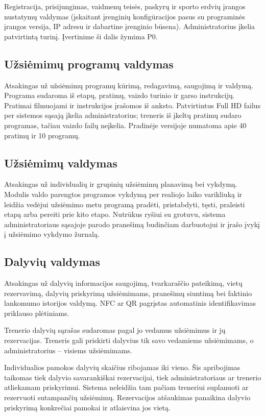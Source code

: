 \documentclass[a4paper,11pt]{article}
\begin{document}
Registracija, prisijungimas, vaidmenų teisės, paskyrų ir sporto erdvių įrangos nustatymų valdymas (įskaitant įrenginių konfigūracijos pasus su programinės įrangos versija, IP adresu ir dabartine įrenginio būsena). Administratorius įkelia patvirtintą turinį. Įvertinime ši dalis žymima P0.

\subsection{Užsiėmimų programų valdymas}

Atsakingas už užsiėmimų programų kūrimą, redagavimą, saugojimą ir valdymą. Programa sudaroma iš etapų, pratimų, vaizdo turinio ir garso instrukcijų. Pratimai filmuojami ir instrukcijos įrašomos iš anksto. Patvirtintus Full HD failus per sistemos sąsają įkelia administratorius; treneris iš įkeltų pratimų sudaro programas, tačiau vaizdo failų neįkelia. Pradinėje versijoje numatoma apie 40 pratimų ir 10 programų.

\subsection{Užsiėmimų valdymas}

Atsakingas už individualių ir grupinių užsiėmimų planavimą bei vykdymą. Modulis valdo parengtos programos vykdymą per realiojo laiko varikliuką ir leidžia vedėjui užsiėmimo metu programą pradėti, pristabdyti, tęsti, praleisti etapą arba pereiti prie kito etapo. Nutrūkus ryšiui su grotuvu, sistema administratoriaus sąsajoje parodo pranešimą budinčiam darbuotojui ir įrašo įvykį į užsiėmimo vykdymo žurnalą.

\subsection{Dalyvių valdymas}

Atsakingas už dalyvių informacijos saugojimą, tvarkaraščio pateikimą, vietų rezervavimą, dalyvių priskyrimą užsiėmimams, pranešimų siuntimą bei faktinio lankomumo istorijos valdymą. NFC ar QR pagrįstas automatinis identifikavimas priklauso plėtiniams.

Trenerio dalyvių sąrašas sudaromas pagal jo vedamus užsiėmimus ir jų rezervacijas. Treneris gali priskirti dalyvius tik savo vedamiems užsiėmimams, o administratorius -- visiems užsiėmimams.

Individualios pamokos dalyvių skaičius ribojamas iki vieno. Šis apribojimas taikomas tiek dalyvio savarankiškai rezervacijai, tiek administratoriaus ar trenerio atliekamam priskyrimui. Sistema neleidžia tam pačiam treneriui suplanuoti ar rezervuoti sutampančių užsiėmimų. Rezervacijos atšaukimas panaikina dalyvio priskyrimą konkrečiai pamokai ir atlaisvina jos vietą.
\end{document}
